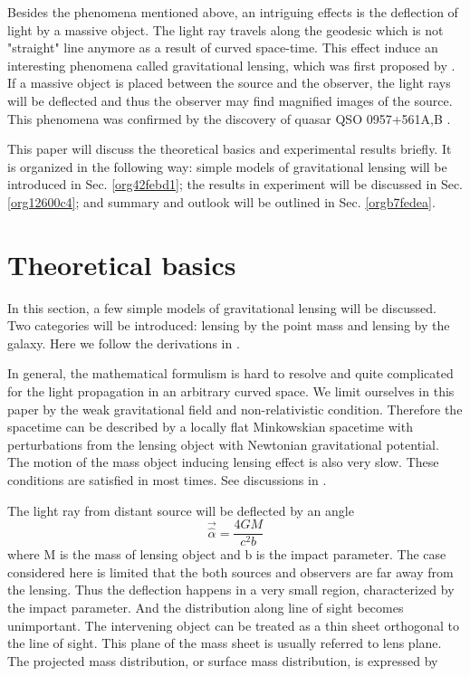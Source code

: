 \documentclass[letter,12pt]{article}
\begin{document}
Besides the phenomena mentioned above, an intriguing effects is the
deflection of light by a massive object. The light ray travels
along the geodesic which is not "straight" line anymore as a result
of curved space-time. This effect induce an interesting phenomena
called gravitational lensing, which was first proposed by
\cite{Einstein506}. If a massive object is placed between the source
and the observer, the light rays will be deflected and thus the
observer may find magnified images of the source. This phenomena was
confirmed by the discovery of quasar QSO 0957+561A,B
\cite{Walsh:1979nx}.

This paper will discuss the theoretical basics and experimental
results briefly. It is organized in the following way: simple models
of gravitational lensing will be introduced in Sec. \ref{org42febd1}; the
results in experiment will be discussed in Sec. \ref{org12600c4}; and
summary and outlook will be outlined in Sec. \ref{orgb7fedea}.

\section{Theoretical basics}
\label{sec:orgaf8760c}
\label{org42febd1}

In this section, a few simple models of gravitational lensing will
be discussed. Two categories will be introduced: lensing by the
point mass and lensing by the galaxy. Here we follow the
derivations in \cite{narayanlectures1997}.

In general, the mathematical formulism is hard to resolve and quite
complicated for the light propagation in an arbitrary curved
space. We limit ourselves in this paper by the weak gravitational
field and non-relativistic condition. Therefore the spacetime can be
described by a locally flat Minkowskian spacetime with perturbations
from the lensing object with Newtonian gravitational potential. The
motion of the mass object inducing lensing effect is also very slow.
These conditions are satisfied in most times. See discussions in
\cite{narayanlectures1997}.

\label{org97411f2} The light ray from distant source will be
deflected by an angle
\begin{equation}
  \vec{\hat{\alpha}} = \frac{4GM}{c^{2}b} \label{eq:alpha-hat}
\end{equation}
where M is the mass of lensing
  object and b is the impact parameter. The case considered here is
  limited that the both sources and observers are far away from the
  lensing. Thus the deflection happens in a very small region,
  characterized by the impact parameter. And the distribution along
  line of sight becomes unimportant. The intervening object can be
  treated as a thin sheet orthogonal to the line of sight. This plane
  of the mass sheet is usually referred to lens plane. The projected
  mass distribution, or surface mass distribution, is expressed by
\end{document}
